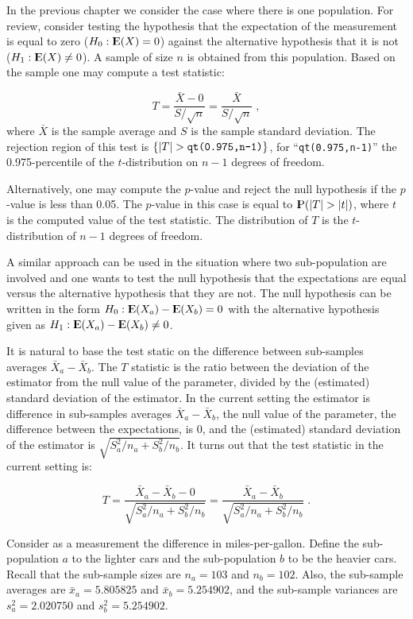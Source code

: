 \documentclass[]{krantz}
\newcommand{\Expec}{{\rm I\kern-.3em E}}
\newcommand{\Prob}{{\rm I\kern-.3em P}}
\theoremstyle{definition}
\theoremstyle{definition}
\theoremstyle{definition}
\theoremstyle{remark}
\begin{document}
In the previous chapter we consider the case where there is one
population. For review, consider testing the hypothesis that the
expectation of the measurement is equal to zero (\(H_0: \Expec(X) = 0\))
against the alternative hypothesis that it is not
(\(H_1: \Expec(X) \not = 0\)). A sample of size \(n\) is obtained from
this population. Based on the sample one may compute a test statistic:

\[T = \frac{\bar X - 0}{S/\sqrt{n}} = \frac{\bar X}{S/\sqrt{n}}\;,\]
where \(\bar X\) is the sample average and \(S\) is the sample standard
deviation. The rejection region of this test is
\(\{|T| > \mbox{\texttt{qt(0.975,n-1)}}\}\), for
``\texttt{qt(0.975,n-1)}'' the 0.975-percentile of the
\(t\)-distribution on \(n-1\) degrees of freedom.

Alternatively, one may compute the \(p\)-value and reject the null
hypothesis if the \(p\)-value is less than 0.05. The \(p\)-value in this
case is equal to \(\Prob(|T| > |t|)\), where \(t\) is the computed value
of the test statistic. The distribution of \(T\) is the
\(t\)-distribution of \(n-1\) degrees of freedom.

A similar approach can be used in the situation where two sub-population
are involved and one wants to test the null hypothesis that the
expectations are equal versus the alternative hypothesis that they are
not. The null hypothesis can be written in the form
\(H_0:\Expec(X_a) - \Expec(X_b) = 0\) with the alternative hypothesis
given as \(H_1:\Expec(X_a) - \Expec(X_b) \not = 0\).

It is natural to base the test static on the difference between
sub-samples averages \(\bar X_a - \bar X_b\). The \(T\) statistic is the
ratio between the deviation of the estimator from the null value of the
parameter, divided by the (estimated) standard deviation of the
estimator. In the current setting the estimator is difference in
sub-samples averages \(\bar X_a - \bar X_b\), the null value of the
parameter, the difference between the expectations, is 0, and the
(estimated) standard deviation of the estimator is
\(\sqrt{S_a^2/n_a + S_b^2/n_b}\). It turns out that the test statistic
in the current setting is:

\[T = \frac{\bar X_a - \bar X_b - 0}{ \sqrt{S_a^2/n_a + S^2_b/n_b}} = \frac{\bar X_a - \bar X_b}{ \sqrt{S_a^2/n_a + S^2_b/n_b}}\;.\]

Consider as a measurement the difference in miles-per-gallon. Define the
sub-population \(a\) to the lighter cars and the sub-population \(b\) to
be the heavier cars. Recall that the sub-sample sizes are \(n_a =103\)
and \(n_b=102\). Also, the sub-sample averages are
\(\bar x_a = 5.805825\) and \(\bar x_b =5.254902\), and the sub-sample
variances are \(s^2_a = 2.020750\) and \(s_b^2 = 5.254902\).
\end{document}
